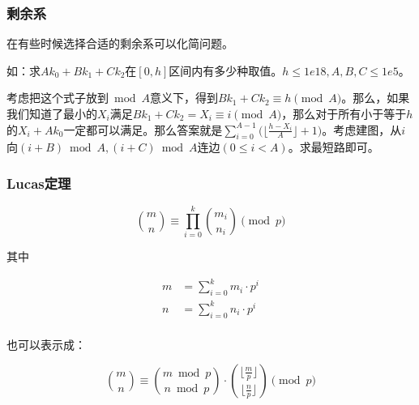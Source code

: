 \documentclass[11pt]{article}
\begin{document}
\subsubsection{剩余系}
\label{sec-1-1-2}

在有些时候选择合适的剩余系可以化简问题。

如：求\(Ak_0+Bk_1+Ck_2\)在\([0,h]\)区间内有多少种取值。\(h \leq 1e18,A, B, C \leq 1e5\)。

考虑把这个式子放到\(\bmod A\)意义下，得到\(Bk_1+Ck_2 \equiv h \pmod A\)。那么，如果我们知道了最小的\(X_i\)满足\(Bk_1+Ck_2=X_i \equiv i \pmod A\)，那么对于所有小于等于\(h\)的\(X_i+Ak_0\)一定都可以满足。那么答案就是\(\sum_{i=0}^{A-1} \Big(\Big\lfloor \frac{h-X_i}{A} \Big \rfloor+1\Big)\)。考虑建图，从\(i\)向\((i+B) \bmod A,(i+C) \bmod A\)连边\((0\leq i < A)\)。求最短路即可。

\subsubsection{Lucas定理}
\label{sec-1-1-3}

$$
{\binom {m}{n}}\equiv \prod _{i=0}^{k}{\binom {m_{i}}{n_{i}}}{\pmod {p}}
$$

其中

$$
\begin{aligned}
m&=\sum_{i=0}^k m_i \cdot p^i\\
n&=\sum_{i=0}^k n_i \cdot p^i\\
\end{aligned}
$$

也可以表示成：

$$
\binom{m}{n} \equiv \binom{m \bmod p}{n \bmod p} \cdot \binom{\lfloor\frac{m}{p} \rfloor}{\lfloor \frac{n}{p} \rfloor} \pmod p
$$
\end{document}
